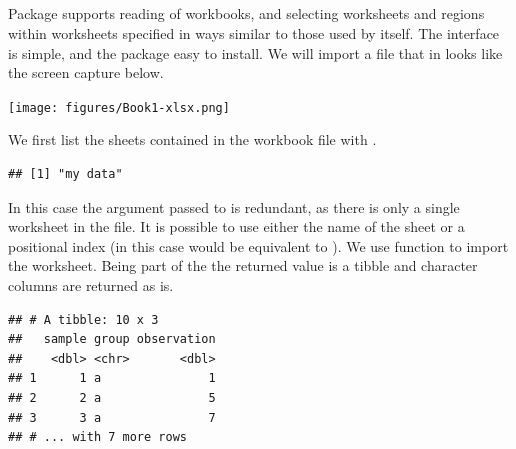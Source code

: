 \documentclass[krantz2]{krantz}\usepackage{knitr}
\begin{document}
\subsection[`readxl']{}\label{sec:files:excel}



Package  supports reading of  workbooks, and selecting worksheets and regions within worksheets specified in ways similar to those used by  itself. The interface is simple, and the package easy to install. We will import a file that in  looks like the screen capture below.

\begin{center}
\texttt{[image: figures/Book1-xlsx.png]}
\end{center}

We first list the sheets contained in the workbook file with .

\begin{knitrout}\footnotesize
{}\color{fgcolor}\begin{kframe}
\begin{alltt}
 \hlkwb{<-} \hlstd{(}\hlstd{)}
\end{alltt}
\begin{verbatim}
## [1] "my data"
\end{verbatim}
\end{kframe}
\end{knitrout}

In this case the argument passed to  is redundant, as there is only a single worksheet in the file. It is possible to use either the name of the sheet or a positional index (in this case  would be equivalent to ). We use function  to import the worksheet. Being part of the  the returned value is a tibble and character columns are returned as is.

\begin{knitrout}\footnotesize
{}\color{fgcolor}\begin{kframe}
\begin{alltt}
 \hlkwb{<-} \hlstd{(}\hlstd{,}  \hlstd{=} \hlstd{)}
\end{alltt}
\begin{verbatim}
## # A tibble: 10 x 3
##   sample group observation
##    <dbl> <chr>       <dbl>
## 1      1 a               1
## 2      2 a               5
## 3      3 a               7
## # ... with 7 more rows
\end{verbatim}
\end{kframe}
\end{knitrout}
\end{document}
